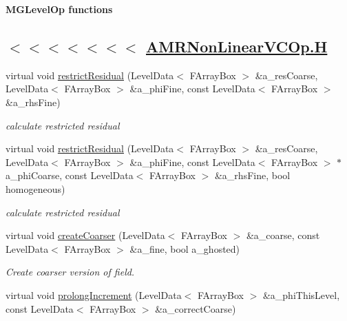 \begin{Indent}{\bf M\-G\-Level\-Op functions}\par
{\em \subsection*{$<$$<$$<$$<$$<$$<$$<$ \hyperlink{_a_m_r_non_linear_v_c_op_8_h_source}{A\-M\-R\-Non\-Linear\-V\-C\-Op.\-H} }}\begin{DoxyCompactItemize}
\item 
virtual void \hyperlink{class_a_m_r_non_linear_v_c_op_ad79ab87f7439844df8c7d57cbf4e33cb}{restrict\-Residual} (Level\-Data$<$ F\-Array\-Box $>$ \&a\-\_\-res\-Coarse, Level\-Data$<$ F\-Array\-Box $>$ \&a\-\_\-phi\-Fine, const Level\-Data$<$ F\-Array\-Box $>$ \&a\-\_\-rhs\-Fine)
\begin{DoxyCompactList}\small\item\em calculate restricted residual \end{DoxyCompactList}\item 
\hypertarget{class_a_m_r_non_linear_v_c_op_aaa6bf1730066db6c608e871e34393de8}{virtual void \hyperlink{class_a_m_r_non_linear_v_c_op_aaa6bf1730066db6c608e871e34393de8}{restrict\-Residual} (Level\-Data$<$ F\-Array\-Box $>$ \&a\-\_\-res\-Coarse, Level\-Data$<$ F\-Array\-Box $>$ \&a\-\_\-phi\-Fine, const Level\-Data$<$ F\-Array\-Box $>$ $\ast$a\-\_\-phi\-Coarse, const Level\-Data$<$ F\-Array\-Box $>$ \&a\-\_\-rhs\-Fine, bool homogeneous)}\label{class_a_m_r_non_linear_v_c_op_aaa6bf1730066db6c608e871e34393de8}

\begin{DoxyCompactList}\small\item\em calculate restricted residual \end{DoxyCompactList}\item 
\hypertarget{class_a_m_r_non_linear_v_c_op_a5aabcacbf3457aed7f6e31672ce9d564}{virtual void \hyperlink{class_a_m_r_non_linear_v_c_op_a5aabcacbf3457aed7f6e31672ce9d564}{create\-Coarser} (Level\-Data$<$ F\-Array\-Box $>$ \&a\-\_\-coarse, const Level\-Data$<$ F\-Array\-Box $>$ \&a\-\_\-fine, bool a\-\_\-ghosted)}\label{class_a_m_r_non_linear_v_c_op_a5aabcacbf3457aed7f6e31672ce9d564}

\begin{DoxyCompactList}\small\item\em Create coarser version of field. \end{DoxyCompactList}\item 
\hypertarget{class_a_m_r_non_linear_v_c_op_acf575f4522cd352a22d4c6da84c12b4d}{virtual void \hyperlink{class_a_m_r_non_linear_v_c_op_acf575f4522cd352a22d4c6da84c12b4d}{prolong\-Increment} (Level\-Data$<$ F\-Array\-Box $>$ \&a\-\_\-phi\-This\-Level, const Level\-Data$<$ F\-Array\-Box $>$ \&a\-\_\-correct\-Coarse)}\label{class_a_m_r_non_linear_v_c_op_acf575f4522cd352a22d4c6da84c12b4d}


\end{DoxyCompactItemize}
\end{Indent}

